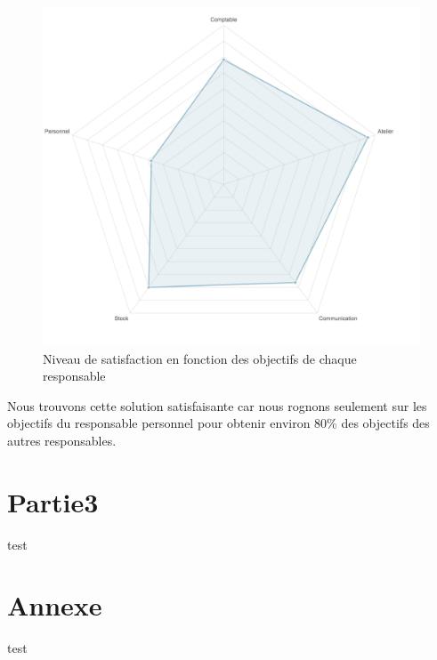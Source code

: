 \documentclass[a4paper, 11pt]{article}
\begin{document}
\begin{figure}[H]
    \begin{center}
        \includegraphics[scale=0.38]{../Partie2/Partie2.png}
        \caption{
            \label{fig} Niveau de satisfaction en fonction des objectifs de chaque responsable
        }
    \end{center}
\end{figure}


Nous trouvons cette solution satisfaisante car nous rognons seulement sur les objectifs du responsable personnel pour obtenir environ 80\% des objectifs des autres responsables. 

\section{Partie3}
test

\section*{Annexe}
test
\end{document}
